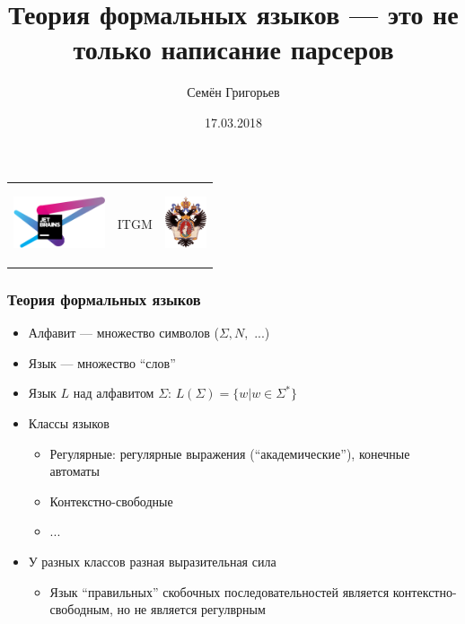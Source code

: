 \documentclass[xcolor=table]{beamer}
\title[CFPQ]{Теория формальных языков --- это не только написание парсеров}
\institute[СПбГУ]{
JetBrains Research, лаборатория языковых инструментов \\
Санкт-Петербургский государственный университет
}
\author[Семён Григорьев]{Семён Григорьев}
\date{17.03.2018}
\begin{document}
{
\begin{frame}[fragile]
  \begin{tabular}{p{2.5cm} p{5.5cm} p{2cm}}
   \begin{center}
      \includegraphics[height=1.5cm]{pictures/JBLogo3.pdf}
    \end{center}
    &
    \begin{center}
      \Huge{ITGM}
    \end{center} 
    &
    \begin{center}
      \includegraphics[height=1.5cm]{pictures/SPbGU_Logo.png}
    \end{center}
  \end{tabular}
  \titlepage
\end{frame}
}


\begin{frame}[fragile]
  \transwipe[direction=90]
  \frametitle{Теория формальных языков}
  \begin{itemize}
  \item Алфавит --- множество символов ($\Sigma, N,$ ...)
  \item Язык --- множество ``слов''
  \item Язык $L$ над алфавитом $\Sigma$: $L(\Sigma) = \{ w | w \in \Sigma^{*} \}$ 
  \item Классы языков
    \begin{itemize}
        \item Регулярные: регулярные выражения (``академические''), конечные автоматы
        \item Контекстно-свободные 
        \item ...
    \end{itemize}
  \item У разных классов разная выразительная сила
    \begin{itemize}
        \item Язык ``правильных'' скобочных последовательностей является контекстно-свободным, но не 
        является регулврным
    \end{itemize}
  \end{itemize}
\end{frame}
\end{document}
